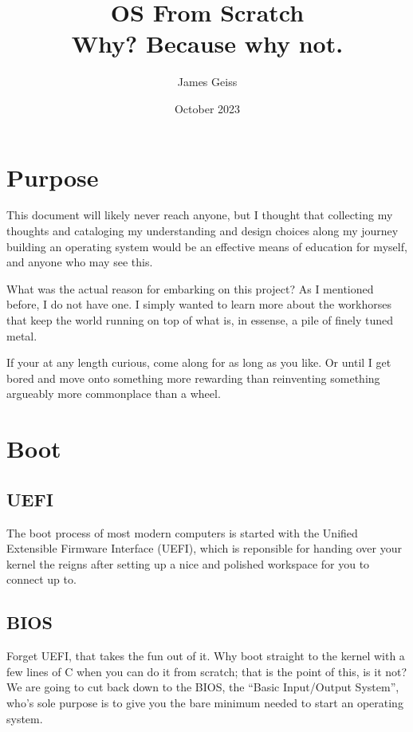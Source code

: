 \documentclass{article}
\title{OS From Scratch \\ \large Why? Because why not.}
\author{James Geiss}
\date{October 2023}
\begin{document}
\maketitle
\newpage

{
	\hypersetup{linkcolor=black}
	\tableofcontents
	\newpage
}

\section{Purpose}

This document will likely never reach anyone, but I thought that collecting my thoughts and cataloging
my understanding and design choices along my journey building an operating system would be an effective
means of education for myself, and anyone who may see this.

What was the actual reason for embarking on this project? As I mentioned before, I do not have one.
I simply wanted to learn more about the workhorses that keep the world running on top of what is, in
essense, a pile of finely tuned metal.

If your at any length curious, come along for as long as you like. Or until I get bored and move onto
something more rewarding than reinventing something argueably more commonplace than a wheel.

\newpage

\section{Boot}

\subsection{UEFI}
The boot process of most modern computers is started with the Unified Extensible Firmware Interface (UEFI),
which is reponsible for handing over your kernel the reigns after setting up a nice and polished workspace for
you to connect up to.

\subsection{BIOS}
Forget UEFI, that takes the fun out of it. Why boot straight to the kernel with a few lines of C when you can
do it from scratch; that is the point of this, is it not? We are going to cut back down to the BIOS, the
``Basic Input/Output System'', who's sole purpose is to give you the bare minimum needed to start an operating
system.
\end{document}
